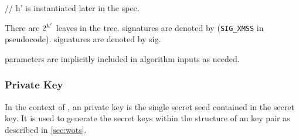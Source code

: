 \begin{code}
  // h' is instantiated later in the spec.
\end{code}

There are $2^{h'}$ leaves in the tree.
\xmss signatures are denoted by \xmsssig (\texttt{SIG\_XMSS} in pseudocode).
\wotsp signatures are denoted by sig.

\xmss parameters are implicitly included in algorithm
inputs as needed.

%
%
%
%

\subsubsection{\xmss Private Key}
In the context of \spx, an \xmss private key is the single secret seed \sseed
contained in the \spx secret key. It is used to generate the \wotsp secret keys
within the structure of an \xmss key pair as described in \autoref{sec:wots}.


